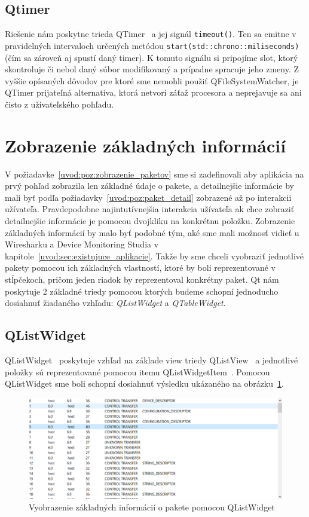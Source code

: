 \subsection*{Qtimer}
Riešenie nám poskytne trieda QTimer~\cite{qtimer} a jej signál \texttt{timeout()}. Ten sa emitne v pravidelných intervaloch určených metódou \texttt{start(std::chrono::miliseconds)} (čím sa zároveň aj spustí daný timer). K tomuto signálu si pripojíme slot, ktorý skontroluje či nebol daný súbor modifikovaný a prípadne spracuje jeho zmeny. Z vyššie opísaných dôvodov pre ktoré sme nemohli použiť QFileSystemWatcher, je QTimer prijateľná alternatíva, ktorá netvorí záťaž procesora a neprejavuje sa ani čisto z užívateľského pohľadu.



\section{Zobrazenie základných informácií}
\label{kap03:sec:zobr_zakl}
V požiadavke~\ref{uvod:poz:zobrazenie_paketov} sme si zadefinovali aby aplikácia na prvý pohľad zobrazila len základné údaje o pakete, a detailnejšie informácie by mali byť podľa požiadavky~\ref{uvod:poz:paket_detail} zobrazené až po interakcii užívateľa. Pravdepodobne najintutívnejšia interakcia užívateľa ak chce zobraziť detailnejšie informácie je pomocou dvojkliku na konkrétnu položku. Zobrazenie základných informácií by malo byť podobné tým, aké sme mali možnosť vidieť u Wiresharku a Device Monitoring Studia v kapitole~\ref{uvod:sec:existujuce_aplikacie}. Takže by sme chceli vyobraziť jednotlivé pakety pomocou ich základných vlastností, ktoré by boli reprezentované v stĺpčekoch, pričom jeden riadok by reprezentoval konkrétny paket. Qt nám poskytuje 2 základné triedy pomocou ktorých budeme schopní jednoducho dosiahnuť žiadaného vzhľadu: \textit{QListWidget} a \textit{QTableWidget}.

\subsection*{QListWidget}
QListWidget~\cite{qlistwidget} poskytuje vzhľad na základe view triedy QListView~\cite{qlistview} a jednotlivé položky sú reprezentované pomocou itemu QListWidgetItem~\cite{qlistwidgetitem}. Pomocou QListWidget sme boli schopní dosiahnuť výsledku ukázaného na obrázku~\ref{obr:kap3:ListViewLook}.

\begin{figure}[!htb]
	\centering
	\includegraphics[width=\textwidth]{img/kap03_ListViewLook}
	\caption{Vyobrazenie základných informácií o pakete pomocou QListWidget}
	\label{obr:kap3:ListViewLook}
\end{figure}

